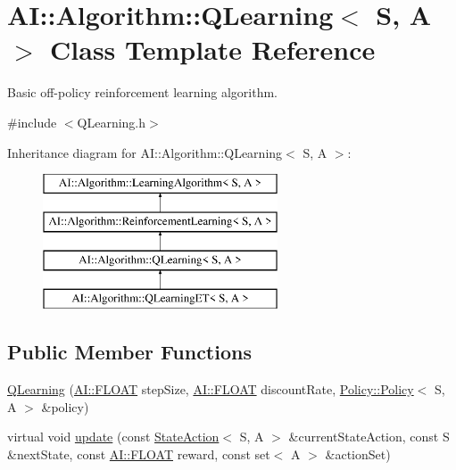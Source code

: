 \hypertarget{classAI_1_1Algorithm_1_1QLearning}{\section{A\-I\-:\-:Algorithm\-:\-:Q\-Learning$<$ S, A $>$ Class Template Reference}
\label{classAI_1_1Algorithm_1_1QLearning}
}


Basic off-\/policy reinforcement learning algorithm.  




{\ttfamily \#include $<$Q\-Learning.\-h$>$}

Inheritance diagram for A\-I\-:\-:Algorithm\-:\-:Q\-Learning$<$ S, A $>$\-:\begin{figure}[H]
\begin{center}
\leavevmode
\includegraphics[height=4.000000cm]{classAI_1_1Algorithm_1_1QLearning}
\end{center}
\end{figure}
\subsection*{Public Member Functions}
\begin{DoxyCompactItemize}
\item 
\hyperlink{classAI_1_1Algorithm_1_1QLearning_a182fd44ac6cd6b2474615ce7b98667ce}{Q\-Learning} (\hyperlink{namespaceAI_a41b74884a20833db653dded3918e05c3}{A\-I\-::\-F\-L\-O\-A\-T} step\-Size, \hyperlink{namespaceAI_a41b74884a20833db653dded3918e05c3}{A\-I\-::\-F\-L\-O\-A\-T} discount\-Rate, \hyperlink{classAI_1_1Algorithm_1_1Policy_1_1Policy}{Policy\-::\-Policy}$<$ S, A $>$ \&policy)
\item 
virtual void \hyperlink{classAI_1_1Algorithm_1_1QLearning_a042e1987ce21a94f59603c4cb1eeed82}{update} (const \hyperlink{classAI_1_1StateAction}{State\-Action}$<$ S, A $>$ \&current\-State\-Action, const S \&next\-State, const \hyperlink{namespaceAI_a41b74884a20833db653dded3918e05c3}{A\-I\-::\-F\-L\-O\-A\-T} reward, const set$<$ A $>$ \&action\-Set)
\end{DoxyCompactItemize}
